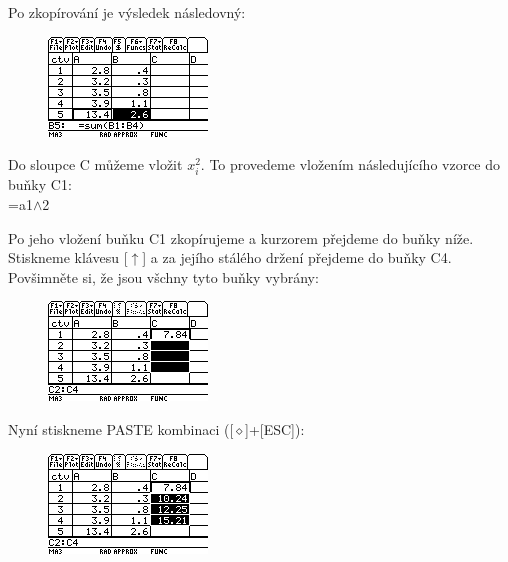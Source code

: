 \documentclass[10pt,a4paper,float]{article}
\begin{document}
Po zkopírování je výsledek následovný:

\begin{figure}[H]
	\centering
	\includegraphics[width=.5\textwidth]{img/CTVERCE3.PNG}
\end{figure}

Do sloupce C můžeme vložit $x_i^2$. To provedeme vložením následujícího vzorce do buňky C1:\\
=a1$\land$2

Po jeho vložení buňku C1 zkopírujeme a kurzorem přejdeme do buňky níže. Stiskneme klávesu [$\uparrow$] a za jejího stálého držení přejdeme do buňky C4. Povšimněte si, že jsou všchny tyto buňky vybrány:

\begin{figure}[H]
	\centering
	\includegraphics[width=.5\textwidth]{img/CTVERCE4.PNG}
\end{figure}

\pagebreak

Nyní stiskneme PASTE kombinaci ([$\diamond$]+[ESC]):

\begin{figure}[H]
	\centering
	\includegraphics[width=.5\textwidth]{img/CTVERCE5.PNG}
\end{figure}
\end{document}
